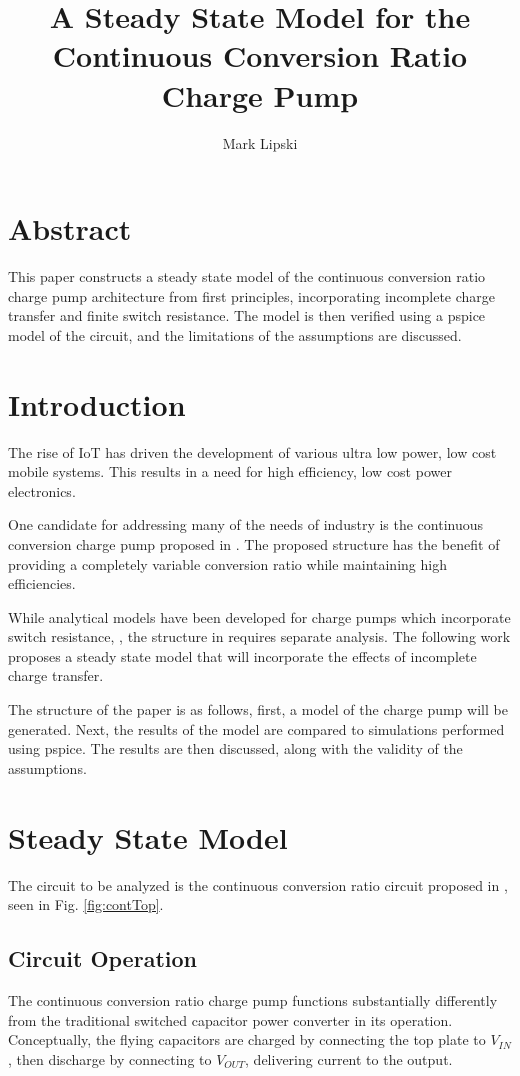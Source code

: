 \documentclass[conference]{IEEEtran}
\title{A Steady State Model for the Continuous Conversion Ratio Charge Pump}
\author{Mark Lipski}
\begin{document}
	\maketitle
	\section{Abstract}
	This paper constructs a steady state model of the continuous conversion ratio charge pump architecture from first principles, incorporating incomplete charge transfer and finite switch resistance. The model is then verified using a pspice model of the circuit, and the limitations of the assumptions are discussed.
	\section{Introduction}
	The rise of IoT has driven the development of various ultra low power, low cost mobile systems. This results in a need for high efficiency, low cost power electronics.
	
	One candidate for addressing many of the needs of industry is the continuous conversion charge pump proposed in \cite{Butzen2019	}. The proposed structure has the benefit of providing a completely variable conversion ratio while maintaining high efficiencies. 

	While analytical models have been developed for charge pumps which incorporate switch resistance, \cite{Tanzawa2011}, the structure in \cite{Butzen2019} requires separate analysis. The following work proposes a steady state model that will incorporate the effects of incomplete charge transfer.
	
	The structure of the paper is as follows, first, a model of the charge pump will be generated. Next, the results of the model are compared to simulations performed using pspice. The results are then discussed, along with the validity of the assumptions.
	\section{Steady State Model}
	The circuit to be analyzed is the continuous conversion ratio circuit proposed in \cite{Butzen2019}, seen in Fig. \ref{fig:contTop}. 
	\subsection{Circuit Operation}
	The continuous conversion ratio charge pump functions substantially differently from the traditional switched capacitor power converter in its operation. Conceptually, the flying capacitors are charged by connecting the top plate to $V_{IN}$, then discharge by connecting to $V_{OUT}$, delivering current to the output.
	
\end{document}
